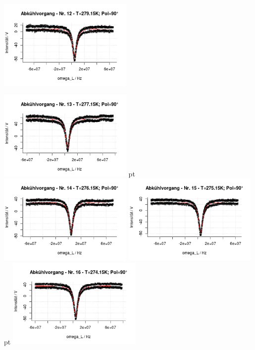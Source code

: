 \documentclass[12pt]{article}
\begin{document}
\begin{minipage}[h!]{\textwidth}
		\includegraphics[width=0.49\textwidth]{figures/cold90-12.png}\vskip -10pt
\end{minipage}\newpage
\begin{minipage}[h!]{\textwidth}
	\centering
		\includegraphics[width=0.49\textwidth]{figures/cold90-13.png} pt
		\includegraphics[width=0.49\textwidth]{figures/cold90-14.png}\vskip -10pt	\includegraphics[width=0.49\textwidth]{figures/cold90-15.png} pt
		\includegraphics[width=0.49\textwidth]{figures/cold90-16.png}\vskip -10pt

\end{minipage}
\end{document}
